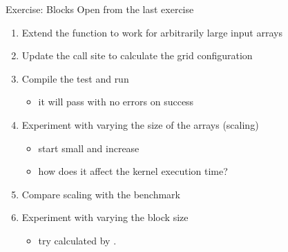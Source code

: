 \begin{frame}[fragile]{Exercise: Blocks}
    Open  from the last exercise
    \begin{enumerate}
        \item Extend the  function to work for arbitrarily large input arrays

        \item Update the call site to calculate the grid configuration

        \item Compile the test and run
        \begin{itemize}
            \item it will pass with no errors on success
        \end{itemize}

        \item Experiment with varying the size of the arrays (scaling)
        \begin{itemize}
            \item start small and increase
            \item how does it affect the kernel execution time?
        \end{itemize}

        \item \extra Compare scaling with the  benchmark

        \item \extra Experiment with varying the block size
        \begin{itemize}
            \item try  calculated by .
        \end{itemize}

    \end{enumerate}

\end{frame}


